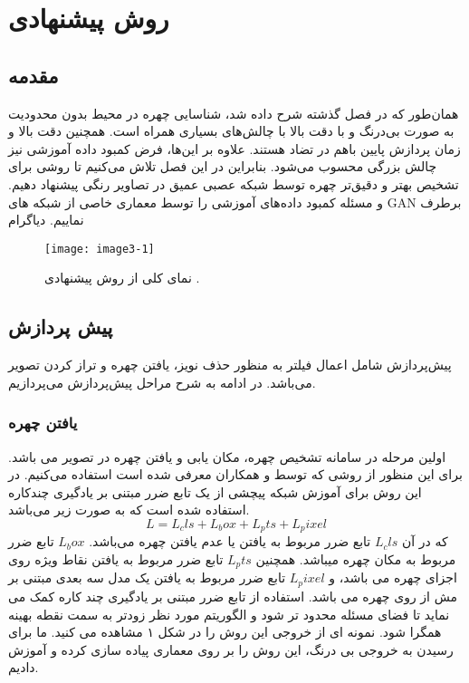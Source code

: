 \chapter{ روش پیشنهادی }
\section{مقدمه}

همان‌طور که در فصل‌ گذشته شرح داده شد، شناسایی چهره در محیط بدون محدودیت به صورت بی‌درنگ و با دقت بالا با چالش‌های بسیاری همراه است. همچنین دقت بالا و زمان پردازش پایین باهم در تضاد هستند. علاوه بر این‌ها، فرض ‌کمبود داده آموزشی نیز چالش بزرگی محسوب می‌شود. بنابراین در این فصل تلاش می‌کنیم تا روشی برای تشخیص بهتر و دقیق‌تر چهره توسط شبکه عصبی عمیق در تصاویر رنگی پیشنهاد دهیم. و مسئله کمبود داده‌های آموزشی را توسط معماری خاصی از شبکه های GAN برطرف نماییم.
\noindent
دیاگرام
\begin{figure}[h]
\centering
  \texttt{[image: image3-1]}
  \caption{نمای کلی از روش پیشنهادی \cite{ref1}.}
  \label{image2-1}
\end{figure}

\section{پیش پردازش}
پیش‌پردازش شامل  اعمال فیلتر به منظور حذف نویز، یافتن چهره و تراز کردن تصویر می‌باشد. در ادامه به شرح مراحل پیش‌پردازش می‌پردازیم.
\subsection{یافتن چهره}
اولین مرحله در سامانه تشخیص چهره، مکان یابی و یافتن چهره در تصویر می باشد. برای این منظور از روشی که توسط  و همکاران \cite{deng2019retinaface} معرفی شده است استفاده می‌کنیم. در این روش برای آموزش شبکه پیچشی از یک تابع ضرر مبتنی بر یادگیری چندکاره استفاده شده است که به صورت زیر می‌باشد.
 \begin{equation}\label{eq3-2}
L = L_cls + L_box + L_pts + L_pixel  
\end{equation}
\noindent
که در آن
$L_cls$
تابع ضرر مربوط به یافتن یا عدم یافتن چهره می‌باشد.
$L_box$
تابع ضرر مربوط به مکان چهره میباشد. همچنین
$L_pts$
تابع ضرر مربوط به یافتن نقاط ویژه روی اجزای چهره می باشد، و
$L_pixel$
تابع ضرر مربوط به یافتن یک مدل سه بعدی مبتنی بر مش از روی چهره می باشد. استفاده از تابع ضرر مبتنی بر یادگیری چند کاره کمک می نماید تا فضای مسئله محدود تر شود و الگوریتم مورد نظر زودتر به سمت نقطه بهینه همگرا شود. نمونه ای از خروجی این روش را در شکل ۱ مشاهده می کنید. ما برای رسیدن به خروجی بی درنگ، این روش را بر روی معماری  پیاده سازی کرده و آموزش دادیم.  

